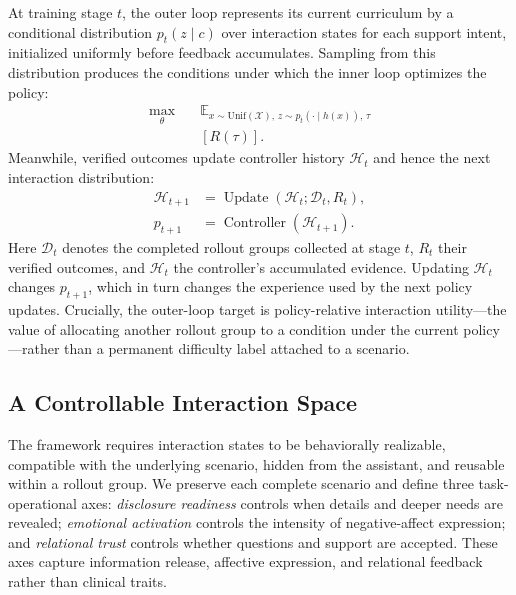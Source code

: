 \documentclass[letterpaper]{article}
\begin{document}
At training stage $t$, the outer loop represents its current curriculum by a conditional distribution $p_t(z\mid c)$ over interaction states for each support intent, initialized uniformly before feedback accumulates. Sampling from this distribution produces the conditions under which the inner loop optimizes the policy:
\begin{equation}
\begin{aligned}
\max_\theta\quad
&\mathbb E_{x\sim\mathrm{Unif}(\mathcal X),\,
z\sim p_t(\cdot\mid h(x)),\,\tau}\\
&\left[R(\tau)\right].
\end{aligned}
\label{eq:inner}
\end{equation}
Meanwhile, verified outcomes update controller history $\mathcal H_t$ and hence the next interaction distribution:
\begin{equation}
\begin{aligned}
\mathcal H_{t+1}
  &=\operatorname{Update}(\mathcal H_t;\mathcal D_t,R_t),\\
p_{t+1}
  &=\operatorname{Controller}(\mathcal H_{t+1}).
\end{aligned}
\end{equation}
Here $\mathcal D_t$ denotes the completed rollout groups collected at stage $t$, $R_t$ their verified outcomes, and $\mathcal H_t$ the controller's accumulated evidence. Updating $\mathcal H_t$ changes $p_{t+1}$, which in turn changes the experience used by the next policy updates. Crucially, the outer-loop target is policy-relative interaction utility---the value of allocating another rollout group to a condition under the current policy---rather than a permanent difficulty label attached to a scenario.

\subsection{A Controllable Interaction Space}
The framework requires interaction states to be behaviorally realizable, compatible with the underlying scenario, hidden from the assistant, and reusable within a rollout group. We preserve each complete scenario and define three task-operational axes: \emph{disclosure readiness} controls when details and deeper needs are revealed; \emph{emotional activation} controls the intensity of negative-affect expression; and \emph{relational trust} controls whether questions and support are accepted. These axes capture information release, affective expression, and relational feedback rather than clinical traits.
\end{document}
